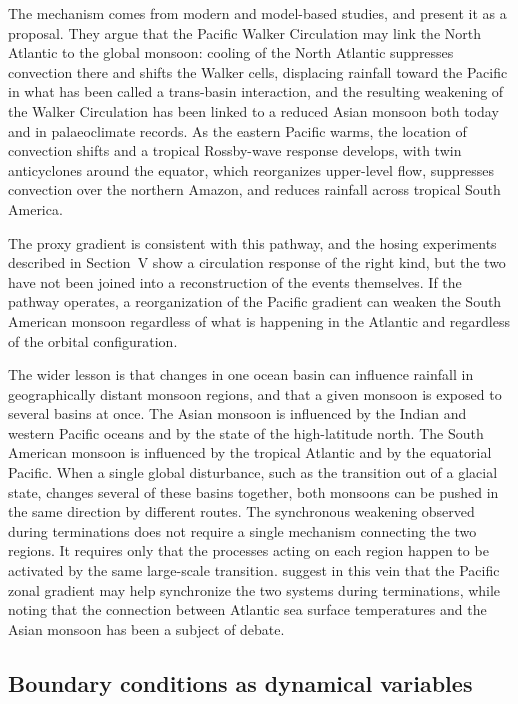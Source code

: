 \documentclass[11pt]{article}
\theoremstyle{definition}
\begin{document}
The mechanism comes from modern and model-based studies, and \citeauthor{olson2026} present it as a proposal. They argue that the Pacific Walker Circulation may link the North Atlantic to the global monsoon: cooling of the North Atlantic suppresses convection there and shifts the Walker cells, displacing rainfall toward the Pacific in what has been called a trans-basin interaction, and the resulting weakening of the Walker Circulation has been linked to a reduced Asian monsoon both today and in palaeoclimate records. As the eastern Pacific warms, the location of convection shifts and a tropical Rossby-wave response develops, with twin anticyclones around the equator, which reorganizes upper-level flow, suppresses convection over the northern Amazon, and reduces rainfall across tropical South America.

The proxy gradient is consistent with this pathway, and the hosing experiments described in Section~V show a circulation response of the right kind, but the two have not been joined into a reconstruction of the events themselves. If the pathway operates, a reorganization of the Pacific gradient can weaken the South American monsoon regardless of what is happening in the Atlantic and regardless of the orbital configuration.

The wider lesson is that changes in one ocean basin can influence rainfall in geographically distant monsoon regions, and that a given monsoon is exposed to several basins at once. The Asian monsoon is influenced by the Indian and western Pacific oceans and by the state of the high-latitude north. The South American monsoon is influenced by the tropical Atlantic and by the equatorial Pacific. When a single global disturbance, such as the transition out of a glacial state, changes several of these basins together, both monsoons can be pushed in the same direction by different routes. The synchronous weakening observed during terminations does not require a single mechanism connecting the two regions. It requires only that the processes acting on each region happen to be activated by the same large-scale transition. \citeauthor{olson2026} suggest in this vein that the Pacific zonal gradient may help synchronize the two systems during terminations, while noting that the connection between Atlantic sea surface temperatures and the Asian monsoon has been a subject of debate.

\subsection{Boundary conditions as dynamical variables}
\end{document}

